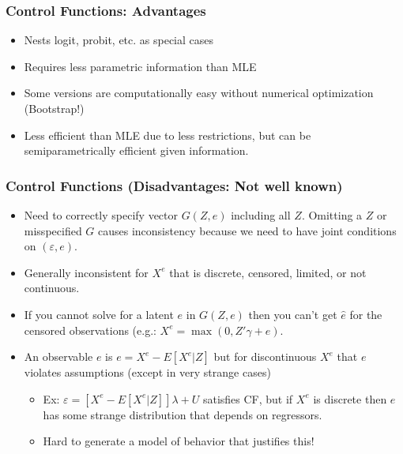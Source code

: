\begin{frame}
\frametitle{Control Functions: Advantages}
\begin{itemize}
\item Nests logit, probit, etc. as special cases
\item Requires less parametric information than MLE
\item Some versions are computationally easy without numerical optimization (Bootstrap!)
\item Less efficient than MLE due to less restrictions, but can be semiparametrically efficient given information.
\end{itemize}
\end{frame}

\begin{frame}
\frametitle{Control Functions (Disadvantages: Not well known)}
\begin{itemize}
\item Need to correctly specify vector $G(Z,e)$ including all $Z$. Omitting a $Z$ or misspecified $G$ causes inconsistency because we need to have joint conditions on $(\varepsilon , e)$.
\item Generally inconsistent for $X^e$ that is discrete, censored, limited, or not continuous.
\item If you cannot solve for a latent $e$ in $G(Z,e)$ then you can't get $\hat{e}$ for the censored observations (e.g.: $X^e = \max(0, Z'\gamma + e)$.
\item An observable $e$ is $e = X^e - E[X^e | Z]$ but for discontinuous $X^e$ that $e$ violates assumptions (except in very strange cases)
\begin{itemize}
\item Ex: $\varepsilon =  [ X^e - E[X^e | Z]] \lambda + U$ satisfies CF, but if $X^e$ is discrete then $e$ has some strange distribution that depends on regressors. 
\item Hard to generate a model of behavior that justifies this!
\end{itemize}
\end{itemize}
\end{frame}



